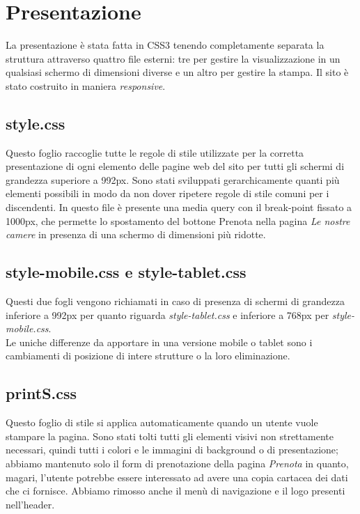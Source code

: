 \section{Presentazione}
La presentazione è stata fatta in CSS3 tenendo completamente separata la struttura attraverso quattro file esterni: tre per gestire la visualizzazione in un qualsiasi schermo di dimensioni diverse e un altro per gestire la stampa. Il sito è stato costruito in maniera \textit{responsive}.
\subsection{style.css}
Questo foglio raccoglie tutte le regole di stile utilizzate per la corretta presentazione di ogni elemento delle pagine web del sito per tutti gli schermi di grandezza superiore a 992px. Sono stati sviluppati gerarchicamente quanti più elementi possibili in modo da non dover ripetere regole di stile comuni per i discendenti. In questo file è presente una media query con il break-point fissato a 1000px, che permette lo spostamento del bottone Prenota nella pagina \textit{Le nostre camere} in presenza di una schermo di dimensioni più ridotte.
\subsection{style-mobile.css e style-tablet.css}
Questi due fogli vengono richiamati in caso di presenza di schermi di grandezza inferiore a 992px per quanto riguarda \textit{style-tablet.css} e inferiore a 768px per \textit{style-mobile.css}.\\ 
Le uniche differenze da apportare in una versione mobile o tablet sono i cambiamenti di posizione di intere strutture o la loro eliminazione.
\subsection{printS.css}
Questo foglio di stile si applica automaticamente quando un utente vuole stampare la pagina. Sono stati tolti tutti gli elementi visivi non strettamente necessari, quindi tutti i colori e le immagini di background o di presentazione; abbiamo mantenuto solo il form di prenotazione della pagina \textit{Prenota} in quanto, magari, l'utente potrebbe essere interessato ad avere una copia cartacea dei dati che ci fornisce. Abbiamo rimosso anche il menù di navigazione e il logo presenti nell'header.